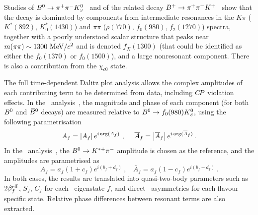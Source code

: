 \mysubsubsubsection{$\Bz \to \pi^+\pi^-\KS$
}
\label{sec:cp_uta:notations:dalitz:pipik0}

Studies of $\Bz \to \pi^+\pi^-\KS$~\cite{Aubert:2009me,:2008wwa}
and of the related decay
$B^{+} \to \pi^+\pi^-K^+$~\cite{Garmash:2004wa,Garmash:2005rv,Aubert:2005ce,Aubert:2008bj}
show that the decay is dominated by components from intermediate resonances 
in the $K\pi$ ($K^*(892)$, $K^*_0(1430)$) 
and $\pi\pi$ ($\rho(770)$, $f_0(980)$, $f_2(1270)$) spectra,
together with a poorly understood scalar structure that peaks near 
$m(\pi\pi) \sim 1300 \ {\rm MeV}/c^2$ and is denoted $f_X(1300)$
(that could be identified as either the $f_0(1370)$ or $f_0(1500)$),
and a large nonresonant component.
There is also a contribution from the $\chi_{c0}$ state.

The full time-dependent Dalitz plot analysis allows 
the complex amplitudes of each contributing term to be determined from data,
including $C\!P$ violation effects.
In the \babar\ analysis~\cite{Aubert:2009me}, 
the magnitude and phase of each component (for both $B^0$ and $\kern 0.18em\overline{\kern -0.18em B}{}^0$ decays) 
are measured relative to $B^0 \to f_0(980)K^0_{\scriptscriptstyle S}$, using the following
parametrisation
\begin{equation}
  A_f = \left| A_f \right| e^{i\,{\rm arg}(A_f)}
  \ , \ \ \ \ 
  \bar{A}_f = \left| \bar{A}_f \right| e^{i\,{\rm arg}(\bar{A}_f)} \, .
\end{equation}
In the \belle\ analysis~\cite{:2008wwa}, the $B^0 \to K^{*+}\pi^-$ amplitude
is chosen as the reference, and the amplitudes are parametrised as 
\begin{equation}
  A_f = a_f ( 1 + c_f ) e^{i ( b_f + d_f )} 
  \ , \ \ \ \ 
  \bar{A}_f = a_f ( 1 - c_f ) e^{i ( b_f - d_f )} \, .
\end{equation}
In both cases, the results are translated into quasi-two-body parameters 
such as $2\beta^{\rm eff}_f$, $S_f$, $C_f$ for each \CP\ eigenstate $f$,
and direct \CP\ asymmetries for each flavour-specific state.
Relative phase differences between resonant terms are also extracted.

\label{sec:cp_uta:notations:dalitz:pipipi0}

